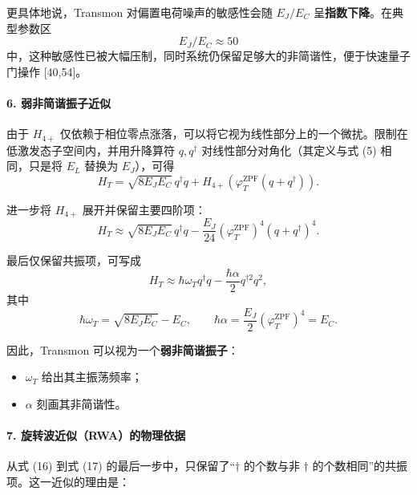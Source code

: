 \documentclass[12pt,a4paper,oneside]{ctexbook}
\begin{document}
更具体地说，Transmon 对偏置电荷噪声的敏感性会随 \(E_J/E_C\) 呈\textbf{指数下降}。在典型参数区
\[
    E_J/E_C\approx 50
\]
中，这种敏感性已被大幅压制，同时系统仍保留足够大的非简谐性，便于快速量子门操作 [40,54]。

\paragraph{6. 弱非简谐振子近似}

由于 \(H_{4+}\) 仅依赖于相位零点涨落，可以将它视为线性部分上的一个微扰。限制在低激发态子空间内，并用升降算符 \(q,q^\dagger\) 对线性部分对角化（其定义与式 (5) 相同，只是将 \(E_L\) 替换为 \(E_J\)），可得
\begin{equation}
    H_T
    =
    \sqrt{8E_JE_C}\,q^\dagger q
    +
    H_{4+}\!\left(\varphi_T^{\mathrm{ZPF}}(q+q^\dagger)\right).
    \tag{15}
\end{equation}

进一步将 \(H_{4+}\) 展开并保留主要四阶项：
\begin{equation}
    H_T
    \approx
    \sqrt{8E_JE_C}\,q^\dagger q
    -
    \frac{E_J}{24}
    \left(\varphi_T^{\mathrm{ZPF}}\right)^4
    (q+q^\dagger)^4.
    \tag{16}
\end{equation}

最后仅保留共振项，可写成
\begin{equation}
    H_T
    \approx
    \hbar\omega_T q^\dagger q
    -
    \frac{\hbar\alpha}{2}q^{\dagger 2}q^2,
    \tag{17}
\end{equation}
其中
\begin{equation}
    \hbar\omega_T=\sqrt{8E_JE_C}-E_C,
    \qquad
    \hbar\alpha=\frac{E_J}{2}\left(\varphi_T^{\mathrm{ZPF}}\right)^4=E_C.
    \tag{18}
\end{equation}

因此，Transmon 可以视为一个\textbf{弱非简谐振子}：
\begin{itemize}[leftmargin=2em]
    \item \(\omega_T\) 给出其主振荡频率；
    \item \(\alpha\) 刻画其非简谐性。
\end{itemize}

\paragraph{7. 旋转波近似（RWA）的物理依据}

从式 (16) 到式 (17) 的最后一步中，只保留了“\(\dagger\) 的个数与非 \(\dagger\) 的个数相同”的共振项。这一近似的理由是：
\end{document}
